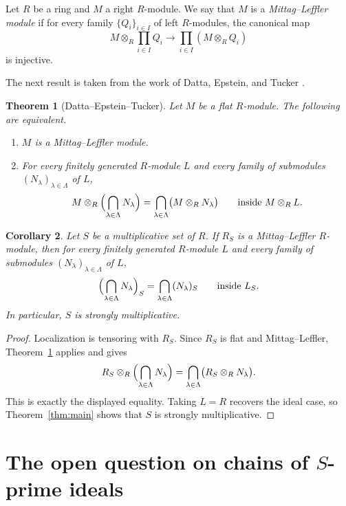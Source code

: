 \documentclass[11pt]{amsart}
\newtheorem{theorem}{Theorem}[section]
\newtheorem{corollary}[theorem]{Corollary}
\theoremstyle{definition}
\theoremstyle{remark}
\begin{document}
Let $R$ be a ring and $M$ a right $R$-module. We say that $M$ is a \emph{Mittag--Leffler module} if for every family $\{Q_i\}_{i\in I}$ of left $R$-modules, the canonical map
\[
M\otimes_R \prod_{i\in I} Q_i \longrightarrow \prod_{i\in I}(M\otimes_R Q_i)
\]
is injective.

The next result is taken from the work of Datta, Epstein, and Tucker \cite{DET}.

\begin{theorem}[Datta--Epstein--Tucker]\label{thm:DET}
Let $M$ be a flat $R$-module.
The following are equivalent.
\begin{enumerate}
\item $M$ is a Mittag--Leffler module.
\item For every finitely generated $R$-module $L$ and every family of submodules $(N_\lambda)_{\lambda \in \Lambda}$ of $L$,
\[
M \otimes_R \Bigl(\bigcap_{\lambda \in \Lambda} N_\lambda\Bigr)
=
\bigcap_{\lambda \in \Lambda} \bigl(M \otimes_R N_\lambda\bigr)
\qquad\text{inside } M \otimes_R L.
\]
\end{enumerate}
\end{theorem}

\begin{corollary}\label{cor:ML}
Let $S$ be a multiplicative set of $R$.
If $R_S$ is a Mittag--Leffler $R$-module, then for every finitely generated $R$-module $L$ and every family of submodules $(N_\lambda)_{\lambda \in \Lambda}$ of $L$,
\[
\Bigl(\bigcap_{\lambda \in \Lambda} N_\lambda\Bigr)_S
=
\bigcap_{\lambda \in \Lambda} (N_\lambda)_S
\qquad\text{inside } L_S.
\]
In particular, $S$ is strongly multiplicative.
\end{corollary}

\begin{proof}
Localization is tensoring with $R_S$.
Since $R_S$ is flat and Mittag--Leffler, Theorem~\ref{thm:DET} applies and gives
\[
R_S \otimes_R \Bigl(\bigcap_{\lambda \in \Lambda} N_\lambda\Bigr)
=
\bigcap_{\lambda \in \Lambda} \bigl(R_S \otimes_R N_\lambda\bigr).
\]
This is exactly the displayed equality.
Taking $L=R$ recovers the ideal case, so Theorem~\ref{thm:main} shows that $S$ is strongly multiplicative.
\end{proof}

\section{The open question on chains of \texorpdfstring{$S$}{S}-prime ideals}
\end{document}
